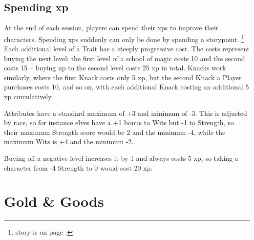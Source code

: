 \begin{multicols}{2}
\subsection{Spending \gls{xp}}


At the end of each session, players can spend their \glspl{xp} to improve their characters.
Spending \glspl{xp} suddenly can only be done by spending a \gls{storypoint}.%
\footnote{ story is on page \pageref{surpriseSkill}.}
Each additional level of a Trait has a steeply progressive cost.
The costs represent buying the next level; the first level of a school of magic costs 10 and the second costs 15 -- buying up to the second level costs 25 \gls{xp} in total.
Knacks work similarly, where the first Knack costs only 5 \gls{xp}, but the second Knack a Player purchases costs 10, and so on, with each additional Knack costing an additional 5 \gls{xp} cumulatively.

Attributes have a standard maximum of +3 and minimum of -3. This is adjusted by race, so for instance elves have a +1 bonus to Wits but -1 to Strength, so their maximum Strength score would be 2 and the minimum -4, while the maximum Wits is +4 and the minimum -2.

Buying off a negative level increases it by 1 and always costs 5 \gls{xp}, so taking a character from -4 Strength to 0 would cost 20 \gls{xp}.

\end{multicols}

\section{Gold \& Goods}
\label{goods}

